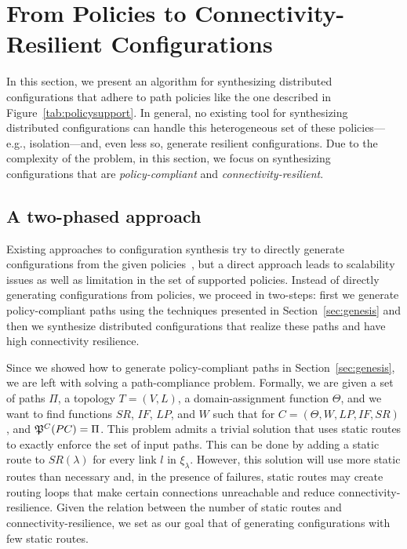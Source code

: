 \section{From Policies to Connectivity-Resilient  Configurations}
\label{sec:config-synthesis}

In this section, we present an algorithm
for synthesizing distributed configurations
that adhere to path policies like the one described in Figure~\ref{tab:policysupport}.
In general, no existing tool for synthesizing distributed configurations
can handle this heterogeneous set of these policies---e.g., isolation---and, even less so,
generate resilient configurations.
Due to the complexity of the problem, in this
section, we focus on 
synthesizing  configurations that are \emph{policy-compliant} and \emph{connectivity-resilient}.



\subsection{A two-phased approach}
Existing approaches to configuration synthesis
try to directly generate configurations from the given policies~\cite{synet},
but a direct approach leads to scalability issues as well as limitation
in the set of supported policies.
Instead of directly generating configurations from policies, 
we proceed in two-steps:
first we generate policy-compliant paths using the techniques presented
in Section~\ref{sec:genesis}
and then we synthesize distributed configurations that realize these paths
and have high connectivity resilience.

Since we showed how to generate policy-compliant paths in Section~\ref{sec:genesis},
we are left with solving a path-compliance problem.
Formally, we are given a set of paths $\Pi$,
a topology $T=(V,L)$,
a domain-assignment function $\Theta$, 
and we want to find functions $SR$,
$IF$, $LP$, and $W$ such that for 
$C=(\Theta,W,LP,IF,SR)$, and
$\mathfrak{P}^C(PC) = \Pi$.
This problem admits a trivial solution that uses
static routes to exactly enforce the set of input paths. 
This can be done by adding a 
static route to $SR(\lambda)$ for every link $l$ in $\xi_\lambda$. 
However, this solution will use more static routes than necessary
and, in the presence of failures, static routes may
create routing loops that make certain connections unreachable and reduce connectivity-resilience.
Given the relation between the number of static routes and connectivity-resilience,
we set as our goal that of generating configurations with few static routes.

